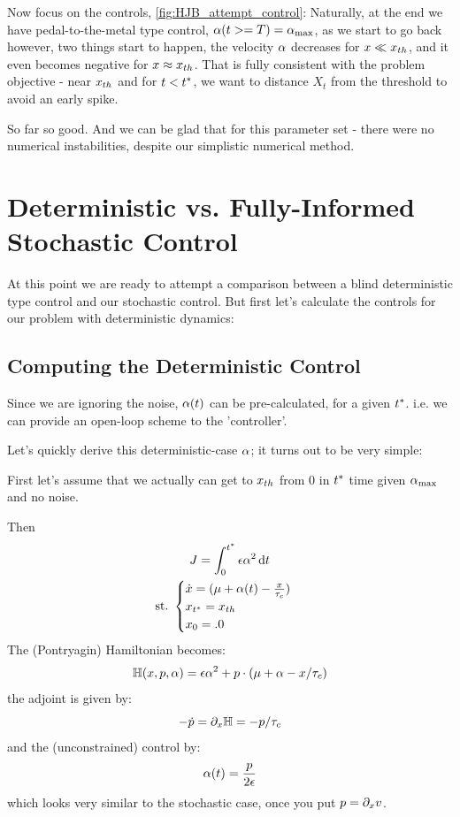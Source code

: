 \documentclass{article}
\begin{document}
Now focus on the controls, \cref{fig:HJB_attempt_control}: Naturally, at the
end we have pedal-to-the-metal type control, ${\alpha}(t>=T) = { {\alpha}_{\textrm{max}} }$, as we start to
go back however, two things start to happen, the velocity ${\alpha}$ decreases for $x
\ll { x_{th} }$, and it even becomes negative for $x \approx { x_{th} }$. 
That is fully consistent with the problem objective - near ${ x_{th} }$ and for
$t<{ t^* }$, we want to distance $X_t$ from the threshold to avoid an early spike.

So far so good. And we can be glad that for this parameter set -
there were no numerical instabilities, despite our simplistic numerical method. 

\section{Deterministic vs. Fully-Informed Stochastic Control}
At this point we are ready to attempt a comparison between a blind deterministic
type control and our stochastic control. But first let's calculate the controls
for our problem with deterministic dynamics:

\subsection{Computing the Deterministic Control}
\label{sec:deterministic_ode_control}
Since we are ignoring the noise, ${\alpha}(t)$ can be pre-calculated, for a given
${ t^* }$. i.e. we can provide an open-loop scheme to the 'controller'.

Let's quickly derive this deterministic-case ${\alpha}$; it turns out to be very
simple:

First let's assume that we actually can get to ${ x_{th} }$ from $0$ in ${ t^* }$ time
given ${ {\alpha}_{\textrm{max}} }$ and no noise. 

Then 
\begin{equation}
\begin{gathered}
J = \int_0^{ t^* } {\epsilon} {\alpha}^2 \, \mathrm{d} t
\\
{ \textrm{st.\ } }
\begin{cases}
\dot{x} = ({\mu } + {\alpha}(t) - \frac{x}{{ \tau_{c} }})
\\
x_{ t^* } = { x_{th} }
\\
x_0 = .0
\end{cases} 
\end{gathered}
\end{equation}
The (Pontryagin) Hamiltonian becomes:
\begin{equation}
{ \mathbb{H}}(x,p, {\alpha}) = {\epsilon} {\alpha}^2 + p \cdot ({\mu } + {\alpha} - x/{ \tau_{c} } )
\end{equation}
the adjoint is given by:
\begin{equation}
-\dot{p} = {\partial}_x { \mathbb{H}} = - p / { \tau_{c} } 
\end{equation} 
and the (unconstrained) control by:
\begin{equation}
{\alpha}(t) = \frac p {2 {\epsilon}}
\end{equation}
which looks very similar to the stochastic case, once you put $p = {\partial}_x v$. 
\end{document}
